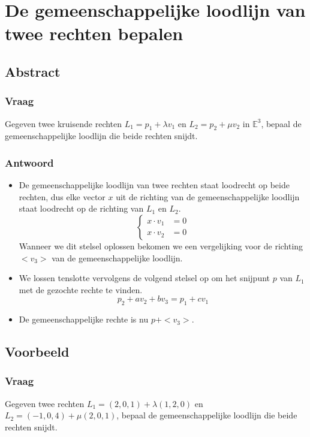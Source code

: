\documentclass[main.tex]{subfiles}
\begin{document}
\newpage
\section{De gemeenschappelijke loodlijn van twee rechten bepalen}
\subsection{Abstract}
\subsubsection{Vraag}
\begin{center}
  Gegeven twee kruisende rechten $L_{1}=p_{1}+\lambda v_{1}$ en $L_{2}=p_{2}+\mu v_{2}$ in $\mathbb{E}^{3}$, bepaal de gemeenschappelijke loodlijn die beide rechten snijdt.
\end{center}

\subsubsection{Antwoord}
\begin{itemize}
\item
  De gemeenschappelijke loodlijn van twee rechten staat loodrecht op beide rechten, dus elke vector $x$ uit de richting van de gemeenschappelijke loodlijn staat loodrecht op de richting van $L_{1}$ en $L_{2}$.
  \[
  \left\{
    \begin{array}{cc}
      x \cdot v_{1} &= 0\\
      x \cdot v_{2} &= 0
    \end{array}
  \right.
  \]
  Wanneer we dit stelsel oplossen bekomen we een vergelijking voor de richting $<v_{3}>$ van de gemeenschappelijke loodlijn.
\item We lossen tenslotte vervolgens de volgend stelsel op om het snijpunt $p$ van $L_{1}$ met de gezochte rechte te vinden.
  \[ p_{2} + a v_{2} + b v_{3} = p_{1} + c v_{1} \]
\item De gemeenschappelijke rechte is nu $p+<v_{3}>$.
\end{itemize}



\subsection{Voorbeeld}
\subsubsection{Vraag}
\begin{center}
  Gegeven twee rechten $L_{1}= (2,0,1) + \lambda(1,2,0)$ en $L_{2}= (-1,0,4) + \mu(2,0,1)$, bepaal de gemeenschappelijke loodlijn die beide rechten snijdt.
\end{center}
\end{document}
